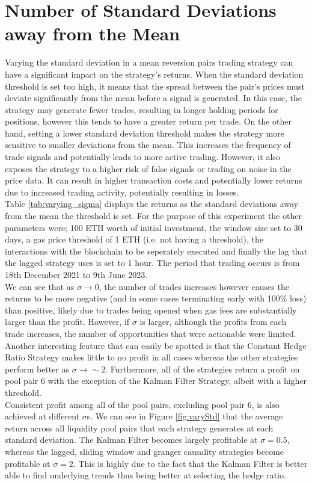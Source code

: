 \section{Number of Standard Deviations away from the Mean}
Varying the standard deviation in a mean reversion pairs trading strategy can have a significant impact on the strategy's returns. When the standard deviation threshold is set too high, it means that the spread between the pair's prices must deviate significantly from the mean before a signal is generated. In this case, the strategy may generate fewer trades, resulting in longer holding periods for positions, however this tends to have a greater return per trade. On the other hand, setting a lower standard deviation threshold makes the strategy more sensitive to smaller deviations from the mean. This increases the frequency of trade signals and potentially leads to more active trading. However, it also exposes the strategy to a higher risk of false signals or trading on noise in the price data. It can result in higher transaction costs and potentially lower returns due to increased trading activity, potentially resulting in losses.
\\[5mm]
Table \ref{tab:varying_sigma} displays the returns as the standard deviations away from the mean the threshold is set. For the purpose of this experiment the other parameters were; 100 ETH worth of initial investment, the window size set to 30 days, a gas price threshold of 1 ETH (i.e. not having a threshold), the interactions with the blockchain to be seperately executed and finally the lag that the lagged strategy uses is set to 1 hour. The period that trading occurs is from 18th December 2021 to 9th June 2023.
\\[5mm]
We can see that as $\sigma \rightarrow 0$, the number of trades increases however causes the returns to be more negative (and in some cases terminating early with 100\% loss) than positive, likely due to trades being opened when gas fees are substantially larger than the profit. However, if $\sigma$ is larger, although the profits from each trade increases, the number of opportunities that were actionable were limited. Another interesting feature that can easily be spotted is that the Constant Hedge Ratio Strategy makes little to no profit in all cases whereas the other strategies perform better as $\sigma \rightarrow \sim2$. Furthermore, all of the strategies return a profit on pool pair 6 with the exception of the Kalman Filter Strategy, albeit with a higher threshold.
\\[5mm]
Consistent profit among all of the pool pairs, excluding pool pair 6, is also achieved at different $\sigma$s. We can see in Figure \ref{fig:varyStd} that the average return across all liquidity pool pairs that each strategy generates at each standard deviation. The Kalman Filter becomes largely profitable at $\sigma = 0.5$, whereas the lagged, sliding window and granger causality strategies become profitable at $\sigma = 2$. This is highly due to the fact that the Kalman Filter is better able to find underlying trends thus being better at selecting the hedge ratio.


